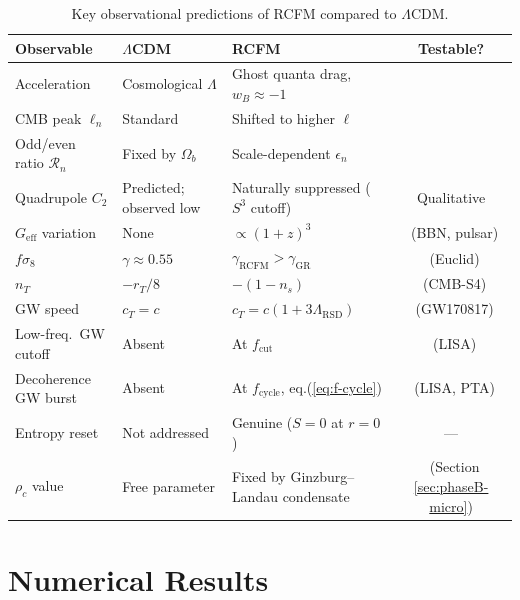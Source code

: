 \documentclass[10pt,twocolumn]{article}
\theoremstyle{definition}
\newcommand{\rhoc}{\rho_{c}}
\DeclareRobustCommand{\onecoltable}[2][]{%
  \begin{table}[#1]%
    \centering
    #2
  \end{table}%
}
\begin{document}
\onecoltable[htb]{%
 \centering
 \caption{Key observational predictions of RCFM compared to $\Lambda$CDM.}
  \label{tab:predictions}
  \begin{tabular}{p{2.8cm}p{3.5cm}p{3.5cm}c}
  \toprule
  Observable
    & $\Lambda$CDM
    & RCFM
    & Testable?\\
  \midrule
  Acceleration
    & Cosmological \( \Lambda \)
    & Ghost quanta drag, \( w_{B}\approx-1 \)
    & \checkmark\\
  CMB peak \( \ell_{n} \)
    & Standard
    & Shifted to higher \( \ell \)
    & \checkmark\\
  Odd/even ratio \( \mathcal{R}_{n} \)
    & Fixed by \( \Omega_{b} \)
    & Scale-dependent \( \epsilon_{n} \)
    & \checkmark\\
  Quadrupole \( C_{2} \)
    & Predicted; observed low
    & Naturally suppressed (\( S^{3} \) cutoff)
    & Qualitative\\
  \( G_{\mathrm{eff}} \) variation
    & None
    & \( \propto(1+z)^{3} \)
    & \checkmark\ (BBN, pulsar)\\
  \( f\sigma_{8} \)
    & \( \gamma\approx0.55 \)
    & \( \gamma_{\mathrm{RCFM}}>\gamma_{\mathrm{GR}} \)
    & \checkmark\ (Euclid)\\
  \( n_{T} \)
    & \( -r_{T}/8 \)
    & \( -(1-n_{s}) \)
    & \checkmark\ (CMB-S4)\\
  GW speed
    & \( c_{T}=c \)
    & \( c_{T}=c(1+3\Lambda_{\mathrm{RSD}}) \)
    & \checkmark\ (GW170817)\\
  Low-freq.\ GW cutoff
    & Absent
    & At \( f_{\mathrm{cut}} \)
    & \checkmark\ (LISA)\\
  Decoherence GW burst
    & Absent
    & At \( f_{\mathrm{cycle}} \), eq.\nobreakspace{}(\ref{eq:f-cycle})
    & \checkmark\ (LISA, PTA)\\
  Entropy reset
    & Not addressed
    & Genuine (\( S=0 \) at \( r=0 \))
    & ---\\
  \( \rhoc \) value
    & Free parameter
    & Fixed by Ginzburg--Landau condensate
    & \checkmark\ (Section \ref{sec:phaseB-micro})\\
  \bottomrule
  \end{tabular}
}

\section{Numerical Results}
\label{sec:numerical}
\end{document}
